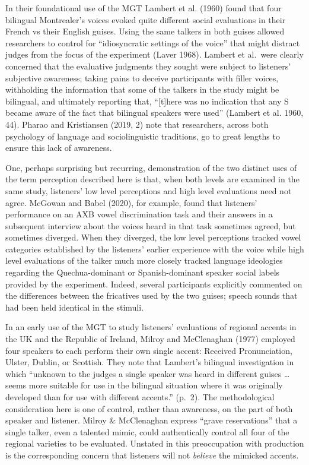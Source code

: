 \documentclass[
  letterpaper,
  DIV=11,
  numbers=noendperiod]{scrartcl}
\begin{document}
In their foundational use of the MGT Lambert et al. (1960) found that
four bilingual Montrealer's voices evoked quite different social
evaluations in their French vs their English guises. Using the same
talkers in both guises allowed researchers to control for
``idiosyncratic settings of the voice'' that might distract judges from
the focus of the experiment (Laver 1968). Lambert et al.~were clearly
concerned that the evaluative judgments they sought were subject to
listeners' subjective awareness; taking pains to deceive participants
with filler voices, withholding the information that some of the talkers
in the study might be bilingual, and ultimately reporting that,
``{[}t{]}here was no indication that any S became aware of the fact that
bilingual speakers were used'' (Lambert et al. 1960, 44). Pharao and
Kristiansen (2019, 2) note that researchers, across both psychology of
language and sociolinguistic traditions, go to great lengths to ensure
this lack of awareness.

One, perhaps surprising but recurring, demonstration of the two distinct
uses of the term perception described here is that, when both levels are
examined in the same study, listeners' low level perceptions and high
level evaluations need not agree. McGowan and Babel (2020), for example,
found that listeners' performance on an AXB vowel discrimination task
and their answers in a subsequent interview about the voices heard in
that task sometimes agreed, but sometimes diverged. When they diverged,
the low level perceptions tracked vowel categories established by the
listeners' earlier experience with the voice while high level
evaluations of the talker much more closely tracked language ideologies
regarding the Quechua-dominant or Spanish-dominant speaker social labels
provided by the experiment. Indeed, several participants explicitly
commented on the differences between the fricatives used by the two
guises; speech sounds that had been held identical in the stimuli.

In an early use of the MGT to study listeners' evaluations of regional
accents in the UK and the Republic of Ireland, Milroy and McClenaghan
(1977) employed four speakers to each perform their own single accent:
Received Pronunciation, Ulster, Dublin, or Scottish. They note that
Lambert's bilingual investigation in which ``unknown to the judges a
single speaker was heard in different guises \ldots{} seems more
suitable for use in the bilingual situation where it was originally
developed than for use with different accents.'' (p.~2). The
methodological consideration here is one of control, rather than
awareness, on the part of both speaker and listener. Milroy \&
McClenaghan express ``grave reservations'' that a single talker, even a
talented mimic, could authentically control all four of the regional
varieties to be evaluated. Unstated in this preoccupation with
production is the corresponding concern that listeners will not
\emph{believe} the mimicked accents.
\end{document}
